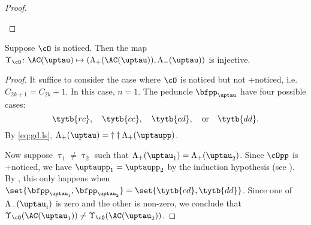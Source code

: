 \documentclass[ssunip]{subfiles}
\begin{document}
\begin{proof}
\begin{enumPF}
    \end{enumPF}
\end{proof}


\begin{lem}\label{c:gd.noticed.inj}
  Suppose $\cO$ is noticed. Then the map $\Upsilon_{\cO}\colon \oAC{\uptau}\mapsto (\Lambda_+(\AC(\uptau)),\nAC{\uptau})$ is injective.
\end{lem}
\begin{proof}
  It suffice to consider the case where $\cO$ is noticed but not +noticed, i.e.
  $C_{2k+1}=C_{2k}+1$. In this case, $n=1$.
  The peduncle $\bfpp_{\uptau}$ have four possible cases:
  \[
    \tytb{rc}, \quad \tytb{cc}, \quad \tytb{cd},\quad \text{or}\quad  \tytb{dd}.
  \]
  By \eqref{eq:gd.ls}, $\pAC{\uptau} = \dagger\dagger\pAC{\uptaupp}$.

  Now suppose $\uptau_{1}\neq \uptau_{2}$ such that
  $\pAC{\uptau_{1}}=\pAC{\uptau_{2}}$.
  Since $\cOpp$ is +noticed, we have $\uptaupp_{1}=\uptaupp_{2}$ by the induction
  hypothesis (see ).
  By , this only happens when
  $\set{\bfpp_{\uptau_{1}},\bfpp_{\uptau_{2}}}=\set{\tytb{cd},\tytb{dd}}$.
  Since one of $\nAC{\uptau_{i}}$ is zero and the other is non-zero, we
  conclude that $\Upsilon_{\cO}(\oAC{\uptau_{1}})\neq \Upsilon_{\cO}(\oAC{\uptau_{2}})$.
\end{proof}
\end{document}

